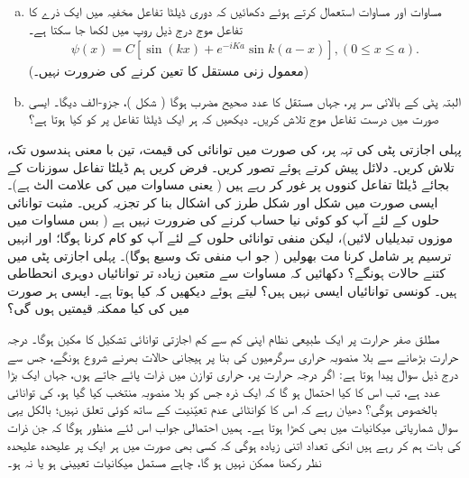 \begin{enumerate}[a.]
\item
 مساوات  اور مساوات  استعمال کرتے ہوئے دکھائیں کہ دوری ڈیلٹا تفاعل مخفیہ میں ایک ذرے کا تفاعل موج درج ذیل روپ میں لکھا جا سکتا ہے۔
\begin{align*}
	\psi(x) = C[\sin(kx)+e^{-iKa}\sin k(a-x)], (0\leq x\leq a).
\end{align*} 
(معمول زنی مستقل  کا تعین کرنے کی ضرورت نہیں۔)
\item
 البتہ پٹی کے بالائی سر پر، جہاں  مستقل  کا عدد صحیح مضرب ہوگا ( شکل )، جزو-الف  دیگا۔ ایسی صورت میں درست تفاعل موج تلاش کریں۔ دیکھیں کہ ہر ایک ڈیلٹا تفاعل پر  کو کیا ہوتا ہے؟
\end{enumerate}
پہلی اجازتی پٹی کی تہہ پر،  کی صورت میں توانائی کی قیمت، تین با معنی ہندسوں تک، تلاش کریں۔ دلائل پیش کرتے ہوئے  تصور کریں۔
فرض کریں ہم ڈیلٹا تفاعل سوزنات کے بجائے ڈیلٹا تفاعل کنووں پر غور کر رہے ہیں ( یعنی مساوات  میں  کی علامت الٹ ہے)۔ ایسی صورت میں
 شکل  اور شکل  طرز کی اشکال بنا کر تجزیہ کریں۔ مثبت توانائی حلوں کے لئے آپ کو کوئی نیا حساب کرنے کی ضرورت نہیں ہے ( بس مساوات  میں موزوں تبدیلیاں لائیں)، لیکن منفی توانائی حلوں کے لئے آپ کو کام کرنا ہوگا؛ اور انہیں ترسیم پر شامل کرنا مت بھولیں ( جو اب منفی  تک وسیع ہوگا)۔ پہلی اجازتی پٹی میں کتنے حالات ہونگے؟
دکھائیں کہ مساوات  سے متعین زیادہ تر توانائیاں دوہری انحطاطی ہیں۔ کونسی توانائیاں ایسی نہیں ہیں؟   لیتے ہوئے دیکھیں کہ کیا ہوتا ہے۔ ایسی ہر صورت میں  کی کیا ممکنہ قیمتیں ہوں گی؟


مطلق صفر حرارت پر ایک طبیعی نظام اپنی کم سے کم اجازتی توانائی تشکیل کا مکین ہوگا۔ درجہ حرارت بڑھانے سے بلا منصوبہ حراری سرگرمیوں کی بنا پر ہیجانی حالات بھرنے شروع ہونگے، جس سے درج ذیل سوال پیدا ہوتا ہے: اگر درجہ حرارت  پر، حراری توازن میں  ذرات پائے جاتے ہوں، جہاں  ایک بڑا عدد ہے، تب اس کا کیا احتمال ہو گا کہ ایک ذرہ جس کو بلا منصوبہ منتخب کیا گیا ہو، کی توانائی بالخصوص  ہوگی؟ دھیان رہے کہ اس کا کوانٹائی عدم تعیّنیت کے ساتھ کوئی تعلق نہیں؛ بالکل یہی سوال  شماریاتی میکانیات میں بھی کھڑا ہوتا ہے۔ ہمیں احتمالی جواب اس لئے منظور ہوگا کہ جن ذرات کی بات ہم کر رہے ہیں انکی تعداد اتنی زیادہ ہوگی کہ کسی بھی صورت میں ہر ایک پر علیحدہ علیحدہ نظر رکھنا ممکن نہیں ہو گا، چاہے مستمل میکانیات تعیینی ہو یا نہ ہو۔

